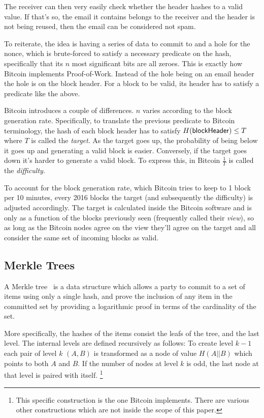 The receiver can then very easily check whether the header hashes to a valid value. If that's so, the email it contains belongs to the receiver and the header is not being reused, then the email can be considered not spam.

To reiterate, the idea is having a series of data to commit to and a hole for the nonce, which is brute-forced to satisfy a necessary predicate on the hash, specifically that its $n$ most significant bits are all zeroes. This is exactly how Bitcoin implements Proof-of-Work. Instead of the hole being on an email header the hole is on the block header. For a block to be valid, its header has to satisfy a predicate like the above.

Bitcoin introduces a couple of differences. $n$ varies according to the block generation rate. Specifically, to translate the previous predicate to Bitcoin terminology, the hash of each block header has to satisfy $H({\sf blockHeader}) \le T$ where $T$ is called the \emph{target}. As the target goes up, the probability of being below it goes up and generating a valid block is easier. Conversely, if the target goes down it's harder to generate a valid block. To express this, in Bitcoin $\frac{1}{T}$ is called the \emph{difficulty}.

To account for the block generation rate, which Bitcoin tries to keep to 1 block per 10 minutes, every 2016 blocks the target (and subsequently the difficulty) is adjusted accordingly. The target is calculated inside the Bitcoin software and is only as a function of the blocks previously seen (frequently called their \emph{view}), so as long as the Bitcoin nodes agree on the view they'll agree on the target and all consider the same set of incoming blocks as valid.

\subsection{\label{sec:merkle-trees}Merkle Trees}
A Merkle tree~\cite{merkle} is a data structure which allows a party to commit to a set of items using only a single hash, and prove the inclusion of any item in the committed set by providing a logarithmic proof in terms of the cardinality of the set.

More specifically, the hashes of the items consist the leafs of the tree, and the last level. The internal levels are defined recursively as follows: To create level $k-1$ each pair of level $k$ $(A, B)$ is transformed as a node of value $H(A || B)$ which points to both $A$ and $B$. If the number of nodes at level $k$ is odd, the last node at that level is paired with itself.
\footnote{This specific construction is the one Bitcoin implements. There are various other constructions which are not inside the scope of this paper.}

